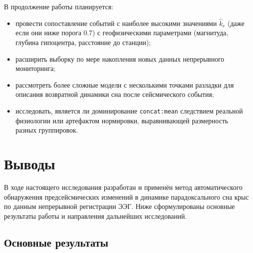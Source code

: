 \documentclass[14pt]{mmcs_article}
\begin{document}
В продолжение работы планируется:

\begin{itemize}
	\item провести сопоставление событий с наиболее высокими
	значениями $\hat{k}_e$ (даже если они ниже порога
	0.7) с геофизическими параметрами (магнитуда,
	глубина гипоцентра, расстояние до станции);
	\item расширить выборку по мере накопления новых данных
	непрерывного мониторинга;
	\item рассмотреть более сложные модели с несколькими
	точками разладки для описания возвратной динамики
	сна после сейсмического события;
	\item исследовать, является ли доминирование
	\texttt{concat:mean} следствием реальной
	физиологии или артефактом нормировки,
	выравнивающей размерность разных группировок.
\end{itemize}


\section*{Выводы}

В ходе настоящего исследования разработан и применён метод
автоматического обнаружения предсейсмических изменений в
динамике парадоксального сна крыс по данным непрерывной
регистрации ЭЭГ. Ниже сформулированы основные результаты
работы и направления дальнейших исследований.

\subsection*{Основные результаты}
\end{document}
